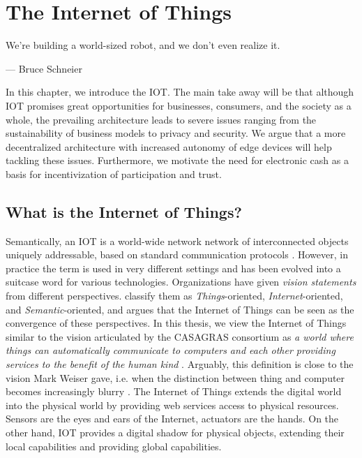 \chapter{The Internet of Things}
\label{sec:iot}

\epigraph{We're building a world-sized robot, and we don't even realize it.}{--- \textup{Bruce Schneier}}

In this chapter, we introduce the \ac{IOT}. The main take away will be that although \ac{IOT} promises great opportunities for businesses, consumers, and the society as a whole, the prevailing architecture leads to severe issues ranging from the sustainability of business models to privacy and security. We argue that a more decentralized architecture with increased autonomy of edge devices will help tackling these issues. Furthermore, we motivate the need for electronic cash as a basis for incentivization of participation and trust.

\section{What is the Internet of Things?}

Semantically, an \ac{IOT} is a world-wide network network of interconnected objects uniquely addressable, based on standard communication protocols \parencite{infso2008networked}. However, in practice the term is used in very different settings and has been evolved into a suitcase word for various technologies. Organizations have given \emph{vision statements} from different perspectives. \cite{Atzori20102787} classify them as \emph{Things}-oriented, \emph{Internet}-oriented, and \emph{Semantic}-oriented, and argues that the Internet of Things can be seen as the convergence of these perspectives. In this thesis, we view the Internet of Things similar to the vision articulated by the CASAGRAS consortium as \emph{a world where things can automatically communicate to computers and each other providing services to the benefit of the human kind} \parencite[c.f. ]{Atzori20102787}. Arguably, this definition is close to the vision Mark Weiser gave, i.e. when the distinction between thing and computer becomes increasingly blurry \parencite{weiser:13609162}. The Internet of Things extends the digital world into the physical world by providing web services access to physical resources. Sensors are the eyes and ears of the Internet, actuators are the hands. On the other hand, \ac{IOT} provides a digital shadow for physical objects, extending their local capabilities and providing global capabilities.

